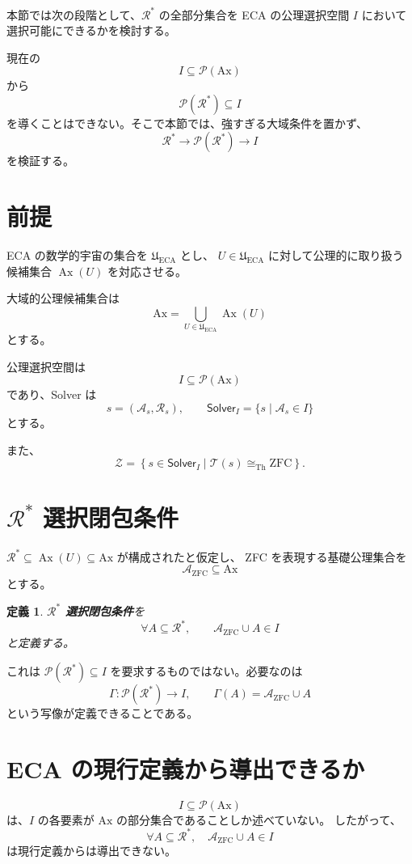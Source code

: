 \documentclass[a4paper,11pt]{article}
\newtheorem{definition}[section]{定義}
\newcommand{\Ax}{\mathrm{Ax}}
\newcommand{\Solver}{\mathsf{Solver}}
\begin{document}
本節では次の段階として、$\mathcal{R}^*$ の全部分集合を ECA の公理選択空間 $I$ において選択可能にできるかを検討する。

現在の
\[
I\subseteq\mathcal{P}(\Ax)
\]
から
\[
\mathcal{P}(\mathcal{R}^*)\subseteq I
\]
を導くことはできない。そこで本節では、強すぎる大域条件を置かず、
\[
\mathcal{R}^*\longrightarrow\mathcal{P}(\mathcal{R}^*)
\longrightarrow I
\]
を検証する。

\section{前提}
ECA の数学的宇宙の集合を $\mathfrak U_{\mathrm{ECA}}$ とし、
$U\in\mathfrak U_{\mathrm{ECA}}$ に対して公理的に取り扱う候補集合
$\operatorname{Ax}(U)$ を対応させる。

大域的公理候補集合は
\[
\Ax=\bigcup_{U\in\mathfrak U_{\mathrm{ECA}}}\operatorname{Ax}(U)
\]
とする。

公理選択空間は
\[
I\subseteq\mathcal{P}(\Ax)
\]
であり、Solver は
\[
s=(\mathcal{A}_s,\mathcal{R}_s),
\qquad
\Solver_I=\{s\mid\mathcal{A}_s\in I\}
\]
とする。

また、
\[
\mathcal{Z}=
\left\{
s\in\Solver_I\mid
\mathcal{T}(s)\cong_{\mathrm{Th}}\mathrm{ZFC}
\right\}.
\]

\section{$\mathcal{R}^*$ 選択閉包条件}
$\mathcal{R}^*\subseteq\operatorname{Ax}(U)\subseteq\Ax$ が構成されたと仮定し、
ZFC を表現する基礎公理集合を
\[
\mathcal{A}_{\mathrm{ZFC}}\subseteq\Ax
\]
とする。

\begin{definition}
\textbf{$\mathcal{R}^*$ 選択閉包条件}を
\[
\boxed{
\forall A\subseteq\mathcal{R}^*,
\qquad
\mathcal{A}_{\mathrm{ZFC}}\cup A\in I
}
\]
と定義する。
\end{definition}

これは
$\mathcal{P}(\mathcal{R}^*)\subseteq I$
を要求するものではない。必要なのは
\[
\Gamma:\mathcal{P}(\mathcal{R}^*)\to I,
\qquad
\Gamma(A)=\mathcal{A}_{\mathrm{ZFC}}\cup A
\]
という写像が定義できることである。

\section{ECA の現行定義から導出できるか}
\[
I\subseteq\mathcal{P}(\Ax)
\]
は、$I$ の各要素が $\Ax$ の部分集合であることしか述べていない。
したがって、
\[
\forall A\subseteq\mathcal{R}^*,
\quad
\mathcal{A}_{\mathrm{ZFC}}\cup A\in I
\]
は現行定義からは導出できない。
\end{document}
